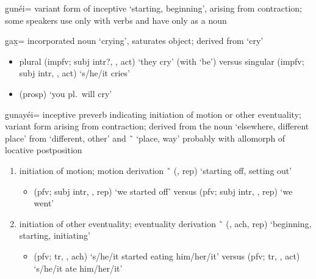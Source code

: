 \begin{morphdesc}[resume*=alphalist]
\item[g̱unéi=]
	variant form of inceptive  ‘starting, beginning’, arising from contraction;
	some speakers use only  with verbs and have  only as a noun

\item[g̱ax̱=]
	incorporated noun ‘crying’, saturates object;
	derived from  ‘cry’
	\begin{itemize}
	\item	plural  (impfv; subj intr?, ,  act) ‘they cry’ (with  ‘be’)\newline
		versus singular  (impfv; subj intr, ,  act) ‘s/he/it cries’
	\item	{} (prosp) ‘you pl.\ will cry’
		\parencite[60.683]{story-naish:1973}
	\end{itemize}

\item[g̱unayéi=]
	inceptive preverb indicating initiation of motion or other eventuality;
	variant form  arising from contraction;
	derived from the noun  ‘elsewhere, different place’
		from  ‘different, other’
		and  \~\  ‘place, way’
		probably with  allomorph of locative postposition 
	\begin{enumerate}
	\item	initiation of motion;
		motion derivation
			 \~\  (,  rep) ‘starting off, setting out’
		\begin{itemize}
		\item	{} (pfv; subj intr, ,  rep) ‘we started off’\newline
			versus  (pfv; subj intr, ,  rep) ‘we went’
		\end{itemize}
	\item	initiation of other eventuality;
		eventuality derivation
			 \~\  (, ach,  rep)
				‘beginning, starting, initiating’
		\begin{itemize}
		\item	{} (pfv; tr, , ach) ‘s/he/it started eating him/her/it’\newline
			versus  (pfv; tr, ,  act) ‘s/he/it ate him/her/it’
		\end{itemize}
	\end{enumerate}
\end{morphdesc}

